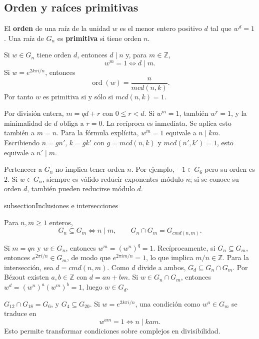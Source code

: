 \subsection{Orden y raíces primitivas}
\begin{definicion}
El \textbf{orden} de una raíz de la unidad $w$ es el menor entero positivo
$d$ tal que $w^d=1$. Una raíz de $G_n$ es \textbf{primitiva} si tiene orden $n$.
\end{definicion}
\begin{proposicion}
Si $w\in G_n$ tiene orden $d$, entonces $d\mid n$ y, para $m\in\mathbb Z$,
\[
w^m=1\iff d\mid m.
\]
Si $w=e^{2k\pi i/n}$, entonces
\[
\operatorname{ord}(w)=\frac{n}{mcd(n,k)}.
\]
Por tanto $w$ es primitiva si y sólo si $mcd(n,k)=1$.
\end{proposicion}
\begin{demostracion}
Por división entera, $m=qd+r$ con $0\leq r<d$.
Si $w^m=1$, también $w^r=1$, y la minimalidad de $d$ obliga a $r=0$.
La recíproca es inmediata. Se aplica esto también a $m=n$.
Para la fórmula explícita, $w^m=1$ equivale a $n\mid km$.
Escribiendo $n=gn'$, $k=gk'$ con $g=mcd(n,k)$ y
$mcd(n',k')=1$, esto equivale a $n'\mid m$.
\end{demostracion}
\begin{nota}{Pertenecer a $G_n$ no implica tener orden $n$.}
Por ejemplo, $-1\in G_6$ pero su orden es $2$.
Si $w\in G_n$, siempre es válido reducir exponentes módulo $n$;
si se conoce su orden $d$, también pueden reducirse módulo $d$.
\end{nota}

subsection{Inclusiones e intersecciones}
\begin{proposicion}
Para $n,m\geq1$ enteros,
\[
G_n\subseteq G_m\iff n\mid m,
\qquad
G_n\cap G_m=G_{cmd(n,m)}.
\]
\end{proposicion}
\begin{demostracion}
Si $m=qn$ y $w\in G_n$, entonces $w^m=(w^n)^q=1$.
Recíprocamente, si $G_n\subseteq G_m$, entonces $e^{2\pi i/n}\in G_m$,
de modo que $e^{2\pi im/n}=1$, lo que implica $m/n\in\mathbb Z$.
Para la intersección, sea $d=cmd(n,m)$. Como $d$ divide a ambos,
$G_d\subseteq G_n\cap G_m$. Por Bézout existen $a,b\in\mathbb Z$
con $d=an+bm$. Si $w\in G_n\cap G_m$, entonces
$w^d=(w^n)^a(w^m)^b=1$, luego $w\in G_d$.
\end{demostracion}
\begin{ejemplo}
$G_{12}\cap G_{18}=G_6$, y $G_4\subseteq G_{20}$.
Si $w=e^{2k\pi i/n}$, una condición como $w^a\in G_m$ se traduce en
\[
w^{am}=1\iff n\mid kam.
\]
Esto permite transformar condiciones sobre complejos en divisibilidad.
\end{ejemplo}


